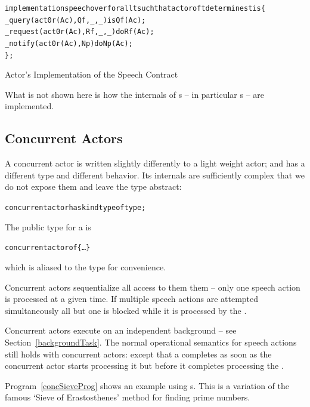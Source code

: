 \begin{program}
\begin{alltt}
implementation speech over for all t such that actor of t determines t is \{
  \_query(act0r(Ac),Qf,_,_) is Qf(Ac);
  \_request(act0r(Ac),Rf,_,_) do Rf(Ac);
  \_notify(act0r(Ac),Np) do Np(Ac);
\};
\end{alltt}
\caption{Actor's Implementation of the Speech Contract}
\label{actorSpeechProg}
\end{program}
\begin{aside}
What is not shown here is how the internals of s -- in particular  s -- are implemented.
\end{aside}

\subsection{Concurrent Actors}
\label{concActor}
A concurrent actor is written slightly differently to a light weight actor; and has a different type and different behavior. Its internals are sufficiently complex that we do not expose them and leave the  type abstract:
\begin{alltt}
concurrent actor has kind type of type;
\end{alltt}
The public type for a  is 
\begin{alltt}
concurrent actor of \{ \ldots \}
\end{alltt}
which is aliased to the  type for convenience.

Concurrent actors sequentialize all access to them them -- only one speech action is processed at a given time. If multiple speech actions are attempted simultaneously all but one is blocked while it is processed by the .

Concurrent actors execute on an independent background  -- see Section~\vref{backgroundTask}. The normal operational semantics for speech actions still holds with concurrent actors: except that a  completes as soon as the concurrent actor starts processing it but before it completes processing the .

Program~\vref{concSieveProg} shows an example using s. This is a variation of the famous `Sieve of Erastosthenes' method for finding prime numbers. 

